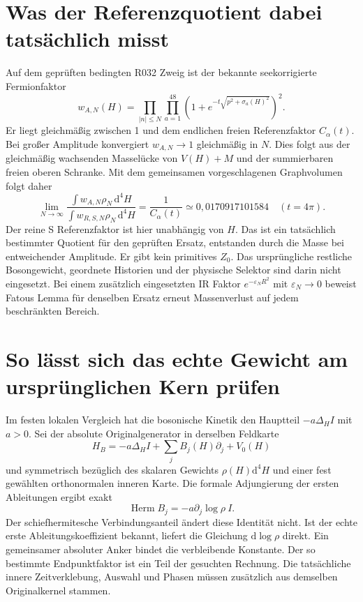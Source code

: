 \documentclass[11pt,a4paper]{article}
\newcommand{\dd}{\mathrm d}
\begin{document}
\section*{Was der Referenzquotient dabei tatsächlich misst}
Auf dem geprüften bedingten R032 Zweig ist der bekannte seekorrigierte Fermionfaktor
\[
 w_{A,N}(H)=\prod_{|n|\le N}\prod_{a=1}^{48}
 (1+e^{-t\sqrt{p^2+\sigma_a(H)^2}})^2 .
\]
Er liegt gleichmäßig zwischen 1 und dem endlichen freien Referenzfaktor $C_\alpha(t)$. Bei großer Amplitude konvergiert $w_{A,N}\to1$ gleichmäßig in $N$. Dies folgt aus der gleichmäßig wachsenden Masselücke von $V(H)+M$ und der summierbaren freien oberen Schranke. Mit dem gemeinsamen vorgeschlagenen Graphvolumen folgt daher
\[
 \lim_{N\to\infty}\frac{\int w_{A,N}\rho_N\,\dd^4 H}
 {\int w_{R,S,N}\rho_N\,\dd^4 H}
 =\frac1{C_\alpha(t)}\simeq0{,}0170917101584\quad(t=4\pi).
\]
Der reine S Referenzfaktor ist hier unabhängig von $H$. Das ist ein tatsächlich bestimmter Quotient für den geprüften Ersatz, entstanden durch die Masse bei entweichender Amplitude. Er gibt kein primitives $Z_0$. Das ursprüngliche restliche Bosongewicht, geordnete Historien und der physische Selektor sind darin nicht eingesetzt. Bei einem zusätzlich eingesetzten IR Faktor $e^{-\varepsilon_N R^2}$ mit $\varepsilon_N\to0$ beweist Fatous Lemma für denselben Ersatz erneut Massenverlust auf jedem beschränkten Bereich.

\section*{So lässt sich das echte Gewicht am ursprünglichen Kern prüfen}
Im festen lokalen Vergleich hat die bosonische Kinetik den Hauptteil $-a\Delta_H I$ mit $a>0$. Sei der absolute Originalgenerator in derselben Feldkarte
\[
 H_B=-a\Delta_H I+\sum_j B_j(H)\partial_j+V_0(H)
\]
und symmetrisch bezüglich des skalaren Gewichts $\rho(H)\dd^4 H$ und einer fest gewählten orthonormalen inneren Karte. Die formale Adjungierung der ersten Ableitungen ergibt exakt
\[
 \operatorname{Herm}B_j=-a\partial_j\log\rho\ I .
\]
Der schiefhermitesche Verbindungsanteil ändert diese Identität nicht. Ist der echte erste Ableitungskoeffizient bekannt, liefert die Gleichung $\dd\log\rho$ direkt. Ein gemeinsamer absoluter Anker bindet die verbleibende Konstante. Der so bestimmte Endpunktfaktor ist ein Teil der gesuchten Rechnung. Die tatsächliche innere Zeitverklebung, Auswahl und Phasen müssen zusätzlich aus demselben Originalkernel stammen.
\end{document}
